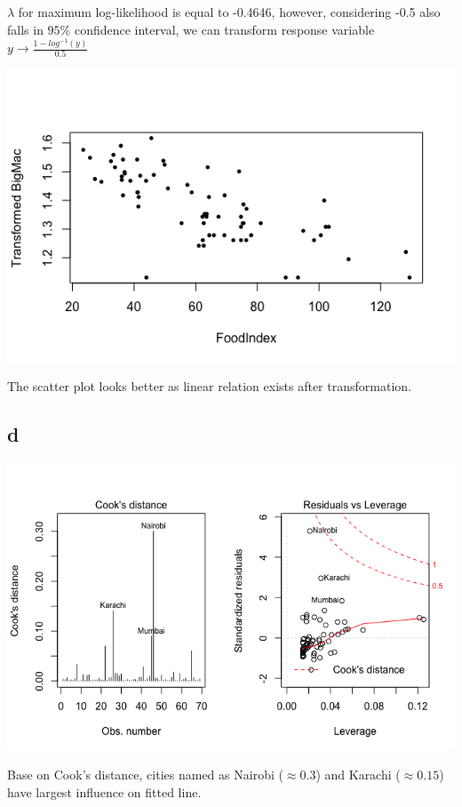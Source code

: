 \documentclass[11pt,letterpaper]{article}
\begin{document}
\noindent $\lambda$ for maximum log-likelihood is equal to -0.4646, however, considering -0.5 also falls in $95 \%$ confidence interval, we can transform response variable $y \rightarrow \frac{1 - log^{-1}(y) }{0.5}$

\includegraphics[scale=0.7]{2-c-2.png}

\noindent The scatter plot looks better as linear relation exists after transformation. 

\subsection*{d}
\includegraphics[scale=0.6]{2-d-1.png}

\noindent Base on Cook's distance, cities named as Nairobi ($\approx 0.3$) and Karachi ($\approx 0.15$) have largest influence on fitted line. 
\end{document}
